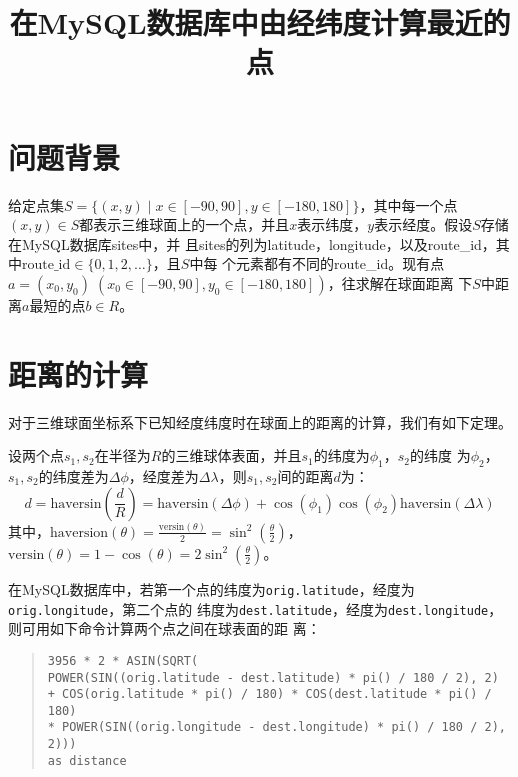 
\title{\textbf{在MySQL数据库中由经纬度计算最近的点}}
\author{}
\date{}

\maketitle
\section{问题背景}
给定点集$S=\{(x,y)\mid x\in[-90, 90], y\in[-180,
180]\}$，其中每一个点$(x, y)\in
S$都表示三维球面上的一个点，并且$x$表示纬度，$y$表示经度。假设$S$存储在MySQL数据库sites中，并
且sites的列为latitude，longitude，以及route\_id，其中$\text{route\_id}\in\{0,1,2,\dots\}$，且$S$中每
个元素都有不同的route\_id。现有点$a=(x_0,y_0)\;(x_0\in[-90,90],y_0\in[-180,180])$，往求解在球面距离
下$S$中距离$a$最短的点$b\in R$。

\section{距离的计算}
对于三维球面坐标系下已知经度纬度时在球面上的距离的计算，我们有如下定理。

\begin{thm}[三维球体表面的距离]
  设两个点$s_1,s_2$在半径为$R$的三维球体表面，并且$s_1$的纬度为$\phi_1$，$s_2$的纬度
  为$\phi_2$，$s_1,s_2$的纬度差为$\Delta\phi$，经度差为$\Delta\lambda$，则$s_1,s_2$间的距离$d$为：
\begin{displaymath}
  d=\mathrm{haversin}(\frac{d}{R})=\mathrm{haversin}(\Delta\phi)+\cos(\phi_1)\cos(\phi_2)\mathrm{haversin}(\Delta\lambda)
\end{displaymath}
其中，$\mathrm{haversion}(\theta)=\frac{\mathrm{versin}(\theta)}{2}=\sin^2(\frac{\theta}{2})$，
$\mathrm{versin}(\theta)=1-\cos(\theta)=2\sin^2(\frac{\theta}{2})$。
\end{thm}

在MySQL数据库中，若第一个点的纬度为\texttt{orig.latitude}，经度为\texttt{orig.longitude}，第二个点的
纬度为\texttt{dest.latitude}，经度为\texttt{dest.longitude}，则可用如下命令计算两个点之间在球表面的距
离：

\begin{quote}
  \texttt{3956 * 2 * ASIN(SQRT(\\
    POWER(SIN((orig.latitude - dest.latitude) * pi() / 180 / 2), 2)\\
    + COS(orig.latitude * pi() / 180) * COS(dest.latitude * pi() / 180)\\
    * POWER(SIN((orig.longitude - dest.longitude) * pi() / 180 / 2), 2)))\\
    as distance}
\end{quote}

